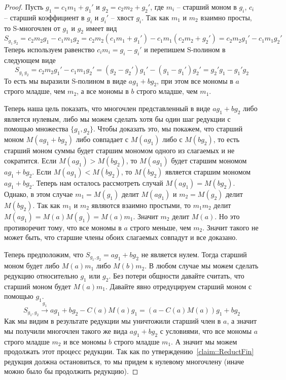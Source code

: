 \begin{proof}
Пусть $g_1 = c_1 m_1 + g_1'$ и $g_2 = c_2 m_2 + g_2'$, где $m_i$ -- старший моном в $g_i$, $c_i$ -- старший коэффициент в $g_i$ и $g_i'$ -- хвост $g_i$.
Так как $m_1$ и $m_2$ взаимно просты, то S-многочлен от $g_1$ и $g_2$ имеет вид
\[
S_{g_1\,g_2} = c_2m_2 g_1 - c_1 m_1 g_2 = c_2m_2 (c_1 m_1 + g_1') - c_1 m_1 (c_2 m_2 + g_2') = c_2m_2 g_1' - c_1 m_1 g_2'
\]
Теперь используем равенство $c_i m_i = g_i - g_i'$ и перепишем S-полином в следующем виде
\[
S_{g_1\,g_2} = c_2m_2 g_1' - c_1 m_1 g_2' = (g_2 - g_2')g_1' - (g_1 - g_1')g_2' = g_2' g_1 - g_1'g_2
\]
То есть мы выразили S-полином в виде $a g_1 + b g_2$, при этом все мономы в $a$ строго младше, чем $m_2$, а все мономы в $b$ строго младше, чем $m_1$.

Теперь наша цель показать, что многочлен представленный в виде $a g_1 + b g_2$ либо является нулевым, либо мы можем сделать хотя бы один шаг редукции с помощью множества $\{g_1, g_2\}$.
Чтобы доказать это, мы покажем, что старший моном $M(a g_1 + b g_2)$ либо совпадает с $M(a g_1)$ либо с $M(bg_2)$, то есть старший моном суммы будет старшим мономом одного из слагаемых и не сократится.
Если $M(a g_1)> M(bg_2)$, то $M(a g_1)$ будет старшим мономом $a g_1 + b g_2$.
Если $M(a g_1) < M(bg_2)$, то $M(bg_2)$ является старшим мономом $a g_1 + b g_2$.
Теперь нам осталось рассмотреть случай $M(a g_1) = M(bg_2)$.
Однако, в этом случае $m_1 = M(g_1)$ делит $M(a g_1)$ и $m_2 = M(g_2)$ делит $M(b g_2)$.
Так как $m_1$ и $m_2$ являются взаимно простыми, то  $m_1 m_2$ делит $M(a g_1) = M(a) M(g_1) = M(a) m_1$.
Значит $m_2$ делит $M(a)$.
Но это противоречит тому, что все мономы в $a$ строго меньше, чем $m_2$.
Значит такого не может быть, что старшие члены обоих слагаемых совпадут и все доказано.

Теперь предположим, что $S_{g_1, g_2} = a g_1 + b g_2$ не является нулем.
Тогда старший моном будет либо $M(a) m_1$ либо $M(b) m_2$.
В любом случае мы можем сделать редукцию относительно $g_1$ или $g_2$.
Без потери общности давайте считать, что старший моном будет $M(a) m_1$.
Давайте явно отредуцируем старший моном с помощью $g_1$.
\[
S_{g_1, g_2}\stackrel{g_1}{\longrightarrow} a g_1 + b g_2 - C(a) M(a) g_1 = (a - C(a) M(a)) g_1 + b g_2
\]
Как мы видим в результате редукции мы уничтожили старший член в $a$, а значит мы получили многочлен такого же вида $a g_1 + b g_2$ с условиями, что все мономы $a$ строго младше $m_2$ и все мономы $b$ строго младше $m_1$.
А значит мы можем продолжать этот процесс редукции.
Так как по утверждению~\ref{claim::ReductFin} редукция должна остановиться, то мы придем к нулевому многочлену (иначе можно было бы продолжить редукцию).
\end{proof}

